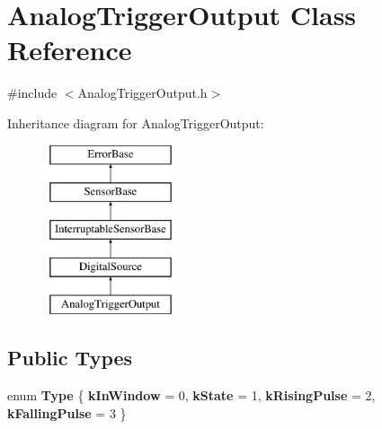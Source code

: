 \hypertarget{classAnalogTriggerOutput}{
\section{AnalogTriggerOutput Class Reference}
\label{classAnalogTriggerOutput}
}


{\ttfamily \#include $<$AnalogTriggerOutput.h$>$}

Inheritance diagram for AnalogTriggerOutput:\begin{figure}[H]
\begin{center}
\leavevmode
\includegraphics[height=5.000000cm]{classAnalogTriggerOutput}
\end{center}
\end{figure}
\subsection*{Public Types}
\begin{DoxyCompactItemize}
\item 
enum {\bfseries Type} \{ {\bfseries kInWindow} = 0, 
{\bfseries kState} = 1, 
{\bfseries kRisingPulse} = 2, 
{\bfseries kFallingPulse} = 3
 \}
\end{DoxyCompactItemize}
